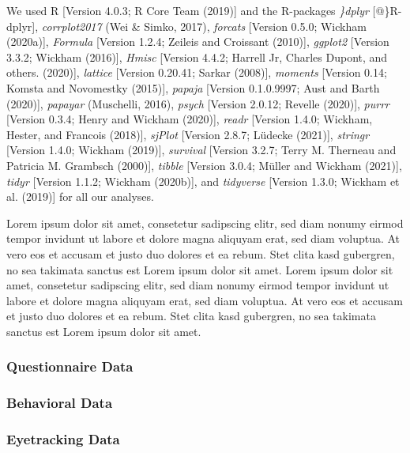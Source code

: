 \documentclass[
  english,
  man,floatsintext]{apa6}
\begin{document}
We used R {[}Version 4.0.3; R Core Team (2019){]} and the R-packages \emph{\}dplyr} {[}@\}R-dplyr{]}, \emph{corrplot2017} (Wei \& Simko, 2017), \emph{forcats} {[}Version 0.5.0; Wickham (2020a){]}, \emph{Formula} {[}Version 1.2.4; Zeileis and Croissant (2010){]}, \emph{ggplot2} {[}Version 3.3.2; Wickham (2016){]}, \emph{Hmisc} {[}Version 4.4.2; Harrell Jr, Charles Dupont, and others. (2020){]}, \emph{lattice} {[}Version 0.20.41; Sarkar (2008){]}, \emph{moments} {[}Version 0.14; Komsta and Novomestky (2015){]}, \emph{papaja} {[}Version 0.1.0.9997; Aust and Barth (2020){]}, \emph{papayar} (Muschelli, 2016), \emph{psych} {[}Version 2.0.12; Revelle (2020){]}, \emph{purrr} {[}Version 0.3.4; Henry and Wickham (2020){]}, \emph{readr} {[}Version 1.4.0; Wickham, Hester, and Francois (2018){]}, \emph{sjPlot} {[}Version 2.8.7; Lüdecke (2021){]}, \emph{stringr} {[}Version 1.4.0; Wickham (2019){]}, \emph{survival} {[}Version 3.2.7; Terry M. Therneau and Patricia M. Grambsch (2000){]}, \emph{tibble} {[}Version 3.0.4; Müller and Wickham (2021){]}, \emph{tidyr} {[}Version 1.1.2; Wickham (2020b){]}, and \emph{tidyverse} {[}Version 1.3.0; Wickham et al. (2019){]} for all our analyses.

Lorem ipsum dolor sit amet, consetetur sadipscing elitr, sed diam nonumy eirmod tempor invidunt ut labore et dolore magna aliquyam erat, sed diam voluptua. At vero eos et accusam et justo duo dolores et ea rebum. Stet clita kasd gubergren, no sea takimata sanctus est Lorem ipsum dolor sit amet. Lorem ipsum dolor sit amet, consetetur sadipscing elitr, sed diam nonumy eirmod tempor invidunt ut labore et dolore magna aliquyam erat, sed diam voluptua. At vero eos et accusam et justo duo dolores et ea rebum. Stet clita kasd gubergren, no sea takimata sanctus est Lorem ipsum dolor sit amet.

\hypertarget{questionnaire-data}{%
\subsubsection{Questionnaire Data}\label{questionnaire-data}}

\hypertarget{behavioral-data}{%
\subsubsection{Behavioral Data}\label{behavioral-data}}

\hypertarget{eyetracking-data-2}{%
\subsubsection{Eyetracking Data}\label{eyetracking-data-2}}
\end{document}
